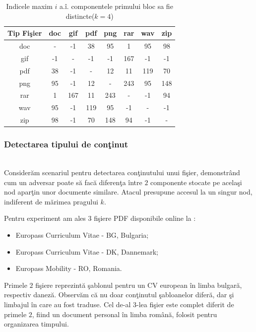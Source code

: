 \documentclass{llncs}
\begin{document}
\begin{table}[H]
\begin{center}
\caption{Indicele maxim $i$ a.\^{i}. componentele primului bloc sa fie distincte($k=4$)}\label{tb:margins}
\label{table:k4}
\begin{tabular}{cccccccc}
Tip Fi\c{s}ier & doc & gif & pdf & png & rar & wav & zip \\\hline
  doc & - & -1 & 38 & 95 & 1 & 95 & 98\\
  gif & -1 & - & -1 & -1 & 167 & -1 & -1\\
  pdf & 38 & -1 & - & 12 & 11 & 119 & 70\\
  png & 95 & -1 & 12 & - & 243 & 95 & 148\\
  rar & 1 & 167 & 11 & 243 & - & -1 & 94\\
  wav & 95 & -1 & 119 & 95 & -1 & - & -1\\
  zip & 98 & -1 & 70 & 148 & 94 & -1 & -\\ \hline
\end{tabular}
\end{center}
\bigskip
\end{table}

\subsubsection{Detectarea tipului de con\c{t}inut} \hspace*{\fill} \\

Consider\u{a}m scenariul pentru detectarea con\c{t}inutului unui fi\c{s}ier, demonstr\^{a}nd cum un adversar poate s\u{a} fac\u{a} diferen\c{t}a \^{i}ntre $2$ componente stocate pe acela\c{s}i nod apar\c{t}in unor documente similare. Atacul presupune accesul la un singur nod, indiferent de m\u{a}rimea pragului $k$.

Pentru experiment am ales $3$ fi\c{s}iere PDF disponibile online la {\cite{Europass:2014}}:
\begin{itemize}
  \item Europass Curriculum Vitae - BG, Bulgaria;
  \item Europass Curriculum Vitae - DK, Dannemark;
  \item Europass Mobility - RO, Romania.
\end{itemize}

Primele $2$ fi\c{s}iere reprezint\u{a} \c{s}ablonul pentru un CV european \^{i}n limba bulgar\u{a}, respectiv danez\u{a}. Observ\u{a}m c\u{a} nu doar con\c{t}inutul \c{s}abloanelor difer\u{a}, dar \c{s}i limbajul \^{i}n care au fost traduse. Cel de-al $3$-lea fi\c{s}ier este complet diferit de primele $2$, fiind un document personal \^{i}n limba rom\^{a}n\u{a}, folosit pentru organizarea timpului.
\end{document}
